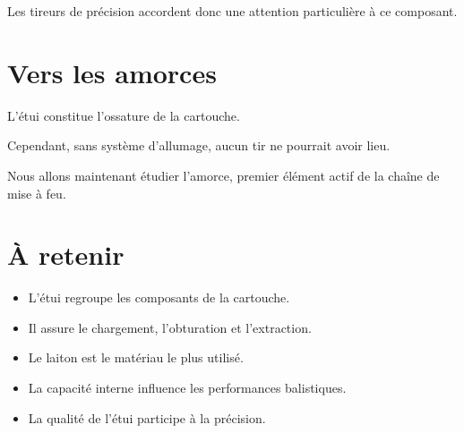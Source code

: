 Les tireurs de précision accordent donc une attention particulière à ce
composant.

\section{Vers les amorces}

L'étui constitue l'ossature de la cartouche.

Cependant, sans système d'allumage, aucun tir ne pourrait avoir lieu.

Nous allons maintenant étudier l'amorce, premier élément actif de la chaîne
de mise à feu.

\section{À retenir}

\begin{aretenir}

\begin{itemize}
    \item L'étui regroupe les composants de la cartouche.
    \item Il assure le chargement, l'obturation et l'extraction.
    \item Le laiton est le matériau le plus utilisé.
    \item La capacité interne influence les performances balistiques.
    \item La qualité de l'étui participe à la précision.
\end{itemize}

\end{aretenir}
